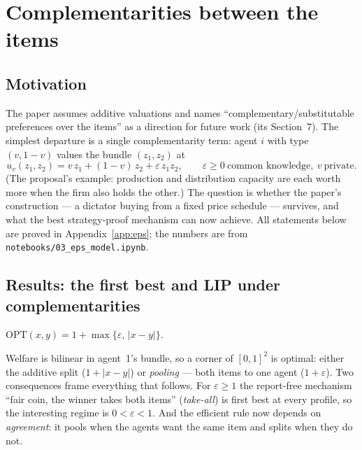 
\section{Complementarities between the items}
\label{sec:eps}

\subsection{Motivation}

The paper assumes additive valuations and names ``complementary/substitutable preferences over
the items'' as a direction for future work (its Section~7). The simplest departure is a single
complementarity term: agent $i$ with type $(v,1-v)$ values the bundle $(z_1,z_2)$ at
\[
u_v(z_1,z_2)=v\,z_1+(1-v)\,z_2+\varepsilon\,z_1z_2,\qquad \varepsilon\ge0\ \text{common knowledge},\ v\ \text{private}.
\]
(The proposal's example: production and distribution capacity are each worth more when the firm
also holds the other.) The question is whether the paper's construction --- a dictator buying
from a fixed price schedule --- survives, and what the best strategy-proof mechanism can now
achieve. All statements below are proved in Appendix~\ref{app:eps}; the numbers are from
\texttt{notebooks/03\_eps\_model.ipynb}.

\subsection{Results: the first best and LIP under complementarities}

\begin{proposition}\label{prop:fb}
$\mathrm{OPT}(x,y)=1+\max\{\varepsilon,\,|x-y|\}$.
\end{proposition}
Welfare is bilinear in agent~1's bundle, so a corner of $[0,1]^2$ is optimal: either the additive
split ($1+|x-y|$) or \emph{pooling} --- both items to one agent ($1+\varepsilon$). Two consequences
frame everything that follows. For $\varepsilon\ge1$ the report-free mechanism ``fair coin, the
winner takes both items'' (\emph{take-all}) is first best at every profile, so the interesting
regime is $0<\varepsilon<1$. And the efficient rule now depends on \emph{agreement}: it pools when
the agents want the same item and splits when they do not.

